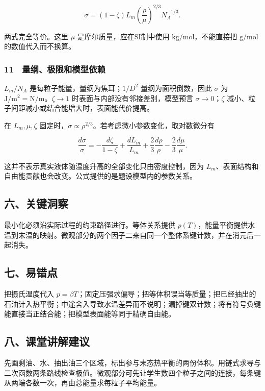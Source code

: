 \documentclass[12pt,a4paper,fontset=fandol]{ctexart}
\begin{document}
\[\boxed{\sigma=(1-\zeta)L_m
\left(\frac\rho\mu\right)^{2/3}N_A^{-1/3}.}\]

两式完全等价。这里 \(\mu\) 是摩尔质量，应在SI制中使用
\(\mathrm{kg/mol}\)，不能直接把 \(\mathrm{g/mol}\) 的数值代入而不换算。

\subsubsection{11　量纲、极限和模型依赖}\label{ux91cfux7eb2ux6781ux9650ux548cux6a21ux578bux4f9dux8d56}

\(L_m/N_A\) 是每粒子能量，量纲为焦耳；\(1/D^2\) 量纲为面积倒数，因此
\(\sigma\) 为 \(\mathrm{J/m^2}= \mathrm{N/m}\)。\(\zeta\to1\)
时表面与内部没有邻接差别，模型预言 \(\sigma\to0\)；\(\zeta\)
减小、粒子间距减小或结合能增大时，表面能代价提高。

在 \(L_m,\mu,\zeta\)
固定时，\(\sigma\propto\rho^{2/3}\)。若考虑微小参数变化，取对数微分有

\[\frac{d\sigma}{\sigma}
=-\frac{d\zeta}{1-\zeta}
+\frac{dL_m}{L_m}
+\frac23\frac{d\rho}{\rho}
-\frac23\frac{d\mu}{\mu}.\]

这并不表示真实液体随温度升高的全部变化只由密度控制，因为
\(L_m\)、表面结构和自由能贡献也会改变。公式提供的是题设模型内的参数关系。

\subsection{六、关键洞察}\label{ux516dux5173ux952eux6d1eux5bdf-2}

最小化必须沿实际过程的约束路径进行。等体关系提供
\(p(T)\)，能量平衡提供水温到末温的映射。微观部分的两个因子二来自同一个整体系键计数，并在消元后一起消失。

\subsection{七、易错点}\label{ux4e03ux6613ux9519ux70b9-2}

把摄氏温度代入
\(p=\beta T\)；固定压强求偏导；把等体积误当等质量；把已经抽出的石油计入热平衡；中途舍入导致水温差异而不说明；漏掉键双计数；将有符号负键能直接当正结合能；把模型表面能等同于精确自由能。

\subsection{八、课堂讲解建议}\label{ux516bux8bfeux5802ux8bb2ux89e3ux5efaux8bae-2}

先画剩油、水、抽出油三个区域，标出参与末态热平衡的两份体积。用链式求导与二次函数两条路线检查极值。微观部分可先让学生数四个粒子之间的连接，每条键从两端各数一次，再由总能量求每粒子平均能量。
\end{document}
